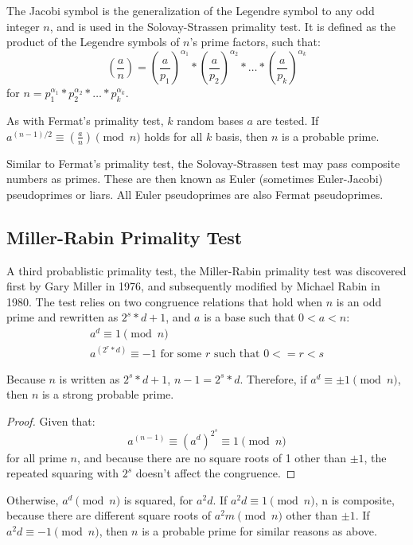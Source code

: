 \documentclass{article}
\begin{document}
The Jacobi symbol is the generalization of the Legendre symbol to any odd integer $n$, and is used in the Solovay-Strassen primality test. It is defined as the product of the Legendre symbols of $n$'s prime factors, such that:
\[
    (\frac{a}{n}) = (\frac{a}{p_1})^{\alpha_{1}} * (\frac{a}{p_2})^{\alpha_{2}} * \ldots{} * (\frac{a}{p_k})^{\alpha_{k}}
\]
for $n = p_1^{\alpha_{1}} * p_2^{\alpha_{2}} * \ldots{} * p_k^{\alpha_{k}}$.

As with Fermat's primality test, $k$ random bases $a$ are tested. If $a^{(n - 1) / 2} \equiv (\frac{a}{n}) \pmod{n}$ holds for all $k$ basis, then $n$ is a probable prime.

Similar to Fermat's primality test, the Solovay-Strassen test may pass composite numbers as primes. These are then known as Euler (sometimes Euler-Jacobi) pseudoprimes or liars. All Euler pseudoprimes are also Fermat pseudoprimes. 

\subsection{Miller-Rabin Primality Test} %
A third probablistic primality test, the Miller-Rabin primality test was discovered first by Gary Miller in 1976, and subsequently modified by Michael Rabin in 1980. The test relies on two congruence relations that hold when $n$ is an odd prime and rewritten as $2^s * d + 1$, and $a$ is a base such that $0 < a < n$:
\begin{gather*}
    a^d \equiv 1 \pmod{n} \\
    a^{(2^r * d)} \equiv -1 \text{ for some $r$ such that $0 <= r < s$}
\end{gather*}

Because $n$ is written as $2^s * d + 1$, $n - 1 = 2^s * d$. Therefore, if $a^d \equiv \pm 1 \pmod{n}$, then $n$ is a strong probable prime.

\begin{proof}
    Given that:
    \[
        a^{(n - 1)} \equiv (a^d)^{2^s} \equiv 1 \pmod{n}
    \]
    for all prime $n$, and because there are no square roots of 1 other than $\pm 1$, the repeated squaring with $2^s$ doesn't affect the congruence.
\end{proof}

Otherwise, $a^d \pmod{n}$ is squared, for $a^2d$. If $a^2d \equiv 1 \pmod{n}$, n is composite, because there are different square roots of $a^2m \pmod{n}$ other than $\pm 1$. If $a^2d \equiv -1 \pmod{n}$, then $n$ is a probable prime for similar reasons as above.
\end{document}

